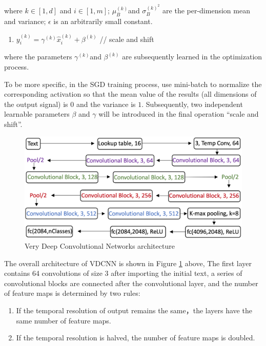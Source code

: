 \documentclass[]{krantz}
\providecommand{\tightlist}{%
  \setlength{\itemsep}{0pt}\setlength{\parskip}{0pt}}
\begin{document}
where \(k \in [1,d]\) and \(i \in [1,m]\); \(\mu_B^{(k)}\)and \(\sigma_B^{(k)^2}\) are the per-dimension mean and variance; \(\epsilon\) is an arbitrarily small constant.

\begin{enumerate}
\def\labelenumi{\arabic{enumi}.}
\setcounter{enumi}{3}
\tightlist
\item
  \(y_i^{(k)} = \gamma^{(k)} \hat{x}_{i}^{(k)} +\beta^{(k)}\) // scale and shift
\end{enumerate}

where the parameters \(\gamma^{(k)}\)and \(\beta^{(k)}\) are subsequently learned in the optimization process.

To be more specific, in the SGD training process, use mini-batch to normalize the corresponding activation so that the mean value of the results (all dimensions of the output signal) is \(0\) and the variance is \(1\). Subsequently, two independent learnable parameters \(\beta\) and \(\gamma\) will be introduced in the final operation ``scale and shift''.

\begin{figure}[ht]

{\centering \includegraphics[width=0.65\linewidth]{figures/01-03-cnns-and-their-applications-in-nlp/VDCNN} 

}

\caption{\label{fig:fig_10} Very Deep Convolutional Networks architecture}\label{fig:figs-10}
\end{figure}

The overall architecture of VDCNN is shown in Figure \ref{fig:figs-10} above, The first layer contains 64 convolutions of size 3 after importing the initial text, a series of convolutional blocks are connected after the convolutional layer, and the number of feature maps is determined by two rules:

\begin{enumerate}
\def\labelenumi{\arabic{enumi}.}
\tightlist
\item
  If the temporal resolution of output remains the same，the layers have the same number of feature maps.
\item
  If the temporal resolution is halved, the number of feature maps is doubled.
\end{enumerate}
\end{document}
